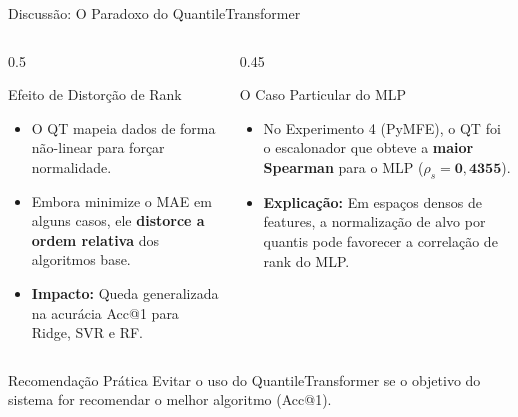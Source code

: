 \documentclass[aspectratio=169, 10pt]{beamer}
\begin{document}
\begin{frame}{Discussão: O Paradoxo do QuantileTransformer}
  \begin{columns}[T]
    \begin{column}{0.5\textwidth}
      \begin{block}{Efeito de Distorção de Rank}
        \small
        \begin{itemize}
          \item O QT mapeia dados de forma não-linear para forçar normalidade.
          \item Embora minimize o MAE em alguns casos, ele \textbf{distorce a ordem relativa} dos algoritmos base.
          \item \textbf{Impacto:} Queda generalizada na acurácia Acc@1 para Ridge, SVR e RF.
        \end{itemize}
      \end{block}
    \end{column}
    
    \begin{column}{0.45\textwidth}
      \begin{alertblock}{O Caso Particular do MLP}
        \small
        \begin{itemize}
          \item No Experimento 4 (PyMFE), o QT foi o escalonador que obteve a \textbf{maior Spearman} para o MLP ($\rho_s = \mathbf{0,4355}$).
          \item \textbf{Explicação:} Em espaços densos de features, a normalização de alvo por quantis pode favorecer a correlação de rank do MLP.
        \end{itemize}
      \end{alertblock}
    \end{column}
  \end{columns}
  \vspace{0.2cm}
  \begin{exampleblock}{Recomendação Prática}
    Evitar o uso do QuantileTransformer se o objetivo do sistema for recomendar o melhor algoritmo (Acc@1).
  \end{exampleblock}
\end{frame}
\end{document}
